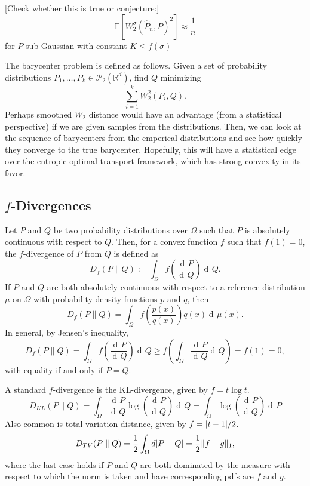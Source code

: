 \documentclass{article}
\newcommand{\dd}{\mathop{\mathrm{d}\!}}
\newcommand{\R}{\mathbb{R}}
\newcommand{\E}{\mathbb{E}}
\renewcommand{\P}{\mathcal{P}}
\DeclarePairedDelimiter{\abs}{\lvert}{\rvert}
\DeclarePairedDelimiter{\norm}{\lVert}{\rVert}
\begin{document}
[Check whether this is true or conjecture:]
\begin{equation*}
    \E[W_2^\sigma(\hat{P}_n,P)^2] \approx \frac{1}{n}
\end{equation*}
for $P$ sub-Gaussian with constant $K \leq f(\sigma)$

The barycenter problem is defined as follows. Given a set of probability distributions $P_1, \dots, P_k \in \P_2(\R^d)$, find $Q$ minimizing
\begin{equation*}
    \sum_{i=1}^k W_2^2(P_i,Q).
\end{equation*}
Perhaps smoothed $W_2$ distance would have an advantage (from a statistical perspective) if we are given samples from the distributions. Then, we can look at the sequence of barycenters from the emperical distributions and see how quickly they converge to the true barycenter. Hopefully, this will have a statistical edge over the entropic optimal transport framework, which has strong convexity in its favor.

\subsection{\texorpdfstring{$f$}{f}-Divergences}
Let $P$ and $Q$ be two probability distributions over $\Omega$ such that $P$ is absolutely continuous with respect to $Q$. Then, for a convex function $f$ such that $f(1) = 0$, the $f$-divergence of $P$ from $Q$ is defined as
\begin{equation*}
    D_f(P \parallel Q) := \int_\Omega f\left(\frac{\dd P}{\dd Q}\right) \dd Q.
\end{equation*}
If $P$ and $Q$ are both absolutely continuous with respect to a reference distribution $\mu$ on $\Omega$ with probability density functions $p$ and $q$, then
\begin{equation*}
    D_f(P \parallel Q) = \int_\Omega f\left(\frac{p(x)}{q(x)}\right)q(x) \dd \mu(x).
\end{equation*}
In general, by Jensen's inequality,
\begin{equation*}
    D_f(P \parallel Q) = \int_\Omega f\left(\frac{\dd P}{\dd Q}\right) \dd Q \geq f\left(\int_\Omega \frac{\dd P}{\dd Q} \dd Q \right) = f(1) = 0,
\end{equation*}
with equality if and only if $P = Q$.

A standard $f$-divergence is the KL-divergence, given by $f = t\log t$.
\begin{equation*}
    D_{KL}(P \parallel Q) = \int_\Omega \frac{\dd P}{\dd Q}\log\left(\frac{\dd P}{\dd Q}\right) \dd Q = \int_\Omega \log\left(\frac{\dd P}{\dd Q}\right) \dd P
\end{equation*}
Also common is total variation distance, given by $f = \abs{t-1}/2$.
\begin{equation*}
    D_{TV}(P \parallel Q) = \frac{1}{2}\int_\Omega d \abs{P - Q} = \frac{1}{2}\norm{f - g}_1,
\end{equation*}
where the last case holds if $P$ and $Q$ are both dominated by the measure with respect to which the norm is taken and have corresponding pdfs are $f$ and $g$.
\end{document}
